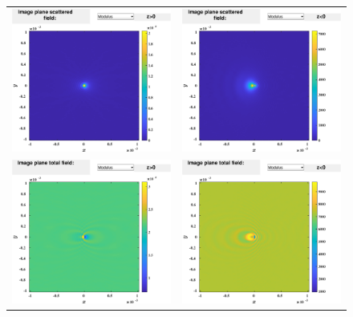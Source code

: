 \begin{figure}[H]
\begin{center}
\begin{tabular}{cc}
  \includegraphics*[width=7.0cm,draft=false]{test1imagepos.eps}
&  \includegraphics*[width=7.0cm,draft=false]{test1imageneg.eps} \\
\includegraphics*[width=7.0cm,draft=false]{test1imageincpos.eps}
&  \includegraphics*[width=7.0cm,draft=false]{test1imageincneg.eps}


\end{tabular}
\end{center}
\end{figure}
